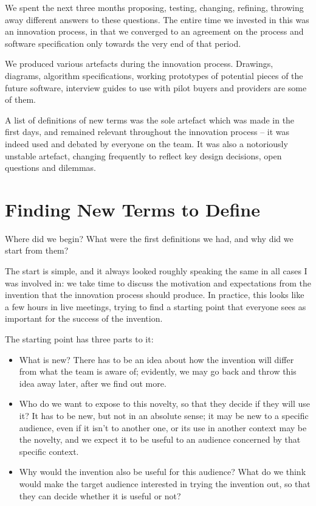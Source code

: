 \documentclass[graybox,envcountchap,sectrefs]{svmono}
\begin{document}
We spent the next three months proposing, testing, changing, refining, throwing away different answers to these questions. The entire time we invested in this was an innovation process, in that we converged to an agreement on the process and software specification only towards the very end of that period. 

We produced various artefacts during the innovation process. Drawings, diagrams, algorithm specifications, working prototypes of potential pieces of the future software, interview guides to use with pilot buyers and providers are some of them. 

A list of definitions of new terms was the sole artefact which was made in the first days, and remained relevant throughout the innovation process -- it was indeed used and debated by everyone on the team. It was also a notoriously unstable artefact, changing frequently to reflect key design decisions, open questions and dilemmas.

\section{Finding New Terms to Define}
Where did we begin? What were the first definitions we had, and why did we start from them? 

The start is simple, and it always looked roughly speaking the same in all cases I was involved in: we take time to discuss the motivation and expectations from the invention that the innovation process should produce. In practice, this looks like a few hours in live meetings, trying to find a starting point that everyone sees as important for the success of the invention. 

The starting point has three parts to it:
\begin{itemize}
	\item What is new? There has to be an idea about how the invention will differ from what the team is aware of; evidently, we may go back and throw this idea away later, after we find out more.
	\item Who do we want to expose to this novelty, so that they decide if they will use it? It has to be new, but not in an absolute sense; it may be new to a specific audience, even if it isn't to another one, or its use in another context may be the novelty, and we expect it to be useful to an audience concerned by that specific context.
	\item Why would the invention also be useful for this audience? What do we think would make the target audience interested in trying the invention out, so that they can decide whether it is useful or not?
\end{itemize}
\end{document}
